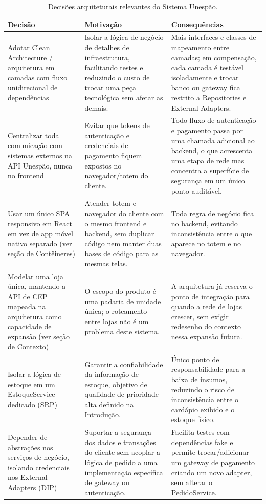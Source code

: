 \documentclass[a4paper,12pt,oneside,openany]{book}
\begin{document}
\begin{table}[H]
\centering
\caption{Decisões arquiteturais relevantes do Sistema Unespão.}
\begin{tabularx}{0.95\textwidth}{p{} X X}
\toprule
\textbf{Decisão} & \textbf{Motivação} & \textbf{Consequências} \\
\midrule
Adotar Clean Architecture / arquitetura em camadas com fluxo unidirecional de dependências & Isolar a lógica de negócio de detalhes de infraestrutura, facilitando testes e reduzindo o custo de trocar uma peça tecnológica sem afetar as demais. & Mais interfaces e classes de mapeamento entre camadas; em compensação, cada camada é testável isoladamente e trocar banco ou gateway fica restrito a Repositories e External Adapters. \\
Centralizar toda comunicação com sistemas externos na API Unespão, nunca no frontend & Evitar que tokens de autenticação e credenciais de pagamento fiquem expostos no navegador/totem do cliente. & Todo fluxo de autenticação e pagamento passa por uma chamada adicional ao backend, o que acrescenta uma etapa de rede mas concentra a superfície de segurança em um único ponto auditável. \\
Usar um único SPA responsivo em React em vez de app móvel nativo separado (ver seção de Contêineres) & Atender totem e navegador do cliente com o mesmo frontend e backend, sem duplicar código nem manter duas bases de código para as mesmas telas. & Toda regra de negócio fica no backend, evitando inconsistência entre o que aparece no totem e no navegador. \\
Modelar uma loja única, mantendo a API de CEP mapeada na arquitetura como capacidade de expansão (ver seção de Contexto) & O escopo do produto é uma padaria de unidade única; o roteamento entre lojas não é um problema deste sistema. & A arquitetura já reserva o ponto de integração para quando a rede de lojas crescer, sem exigir redesenho do contexto nessa expansão futura. \\
Isolar a lógica de estoque em um EstoqueService dedicado (SRP) & Garantir a confiabilidade da informação de estoque, objetivo de qualidade de prioridade alta definido na Introdução. & Único ponto de responsabilidade para a baixa de insumos, reduzindo o risco de inconsistência entre o cardápio exibido e o estoque físico. \\
Depender de abstrações nos serviços de negócio, isolando credenciais nos External Adapters (DIP) & Suportar a segurança dos dados e transações do cliente sem acoplar a lógica de pedido a uma implementação específica de gateway ou autenticação. & Facilita testes com dependências fake e permite trocar/adicionar um gateway de pagamento criando um novo adapter, sem alterar o PedidoService. \\
\bottomrule
\end{tabularx}
\end{table}
\end{document}
